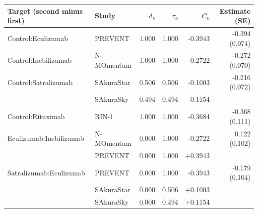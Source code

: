 \begin{tabular}{llrrrr}
\toprule
Target (second minus first) & Study & $d_k$ & $\tau_k$ & $C_k$ & Estimate (SE) \\
\midrule
Control:Eculizumab & PREVENT & 1.000 & 1.000 & -0.3943 & -0.394 (0.074) \\
Control:Inebilizumab & N-MOmentum & 1.000 & 1.000 & -0.2722 & -0.272 (0.070) \\
Control:Satralizumab & SAkuraStar & 0.506 & 0.506 & -0.1003 & -0.216 (0.072) \\
 & SAkuraSky & 0.494 & 0.494 & -0.1154 &  \\
Control:Rituximab & RIN-1 & 1.000 & 1.000 & -0.3684 & -0.368 (0.111) \\
Eculizumab:Inebilizumab & N-MOmentum & 0.000 & 1.000 & -0.2722 & 0.122 (0.102) \\
 & PREVENT & 0.000 & 1.000 & +0.3943 &  \\
Satralizumab:Eculizumab & PREVENT & 0.000 & 1.000 & -0.3943 & -0.179 (0.104) \\
 & SAkuraStar & 0.000 & 0.506 & +0.1003 &  \\
 & SAkuraSky & 0.000 & 0.494 & +0.1154 &  \\
\bottomrule
\end{tabular}
